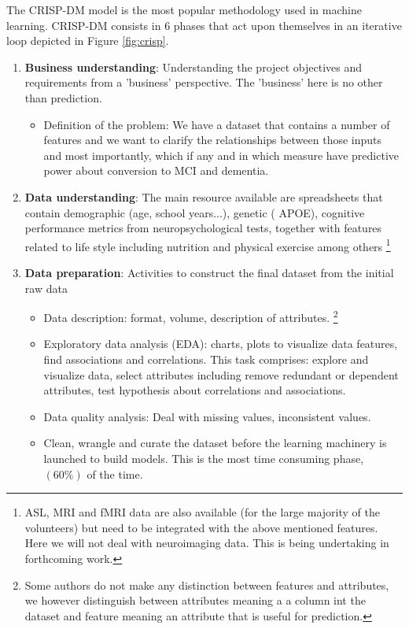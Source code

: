 \documentclass[11pt]{article}
\theoremstyle{definition}
\theoremstyle{remark}
\begin{document}
The CRISP-DM model is the most popular methodology used in machine learning. CRISP-DM consists in 6 phases that act upon themselves in an iterative loop depicted in Figure \ref{fig:crisp}.
\begin{enumerate}
\item \textbf{Business understanding}: Understanding the project objectives and requirements from a 'business' perspective. The 'business' here is no other than prediction. 
	\begin{itemize}
		\item Definition of the problem: We have a dataset that contains a number of features and we want to clarify the relationships between those inputs and most importantly, which if any and in which measure have predictive power about conversion to MCI and dementia.
	\end{itemize}
\item \textbf{Data understanding}: The main resource available are spreadsheets that contain demographic (age, school years...), genetic ( APOE), cognitive performance metrics from neuropsychological tests, together with features related to life style including nutrition and physical exercise among others \footnote{ASL, MRI and fMRI data are also available (for the large majority of the volunteers) but need to be integrated with the above mentioned features. Here we will not deal with neuroimaging data. This is being undertaking in forthcoming work.}
\item \textbf{Data preparation}: Activities to construct the final dataset from the initial raw data
	\begin{itemize}
		\item Data description: format, volume, description of attributes. \footnote{Some authors do not make any distinction between features and attributes, we however distinguish between attributes meaning a a column int the dataset and feature meaning an attribute that is useful for prediction.}
		\item Exploratory data analysis (EDA): charts, plots to visualize data features, find associations and correlations. This task comprises: explore and visualize data, select attributes including remove redundant or dependent attributes, test hypothesis about correlations and associations.
		\item Data quality analysis: Deal with missing values, inconsistent values.
		\item Clean, wrangle and curate the dataset before the learning machinery is launched to build models. This is the most time consuming phase, $(60\%)$ of the time.

\end{itemize}
\end{enumerate}
\end{document}
